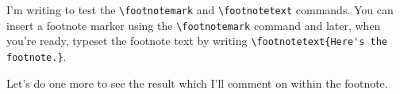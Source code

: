\documentclass{article}
\begin{document}
	I'm writing to test the \verb|\footnotemark| and \verb|\footnotetext| commands. 
	You can insert a footnote marker using the \verb|\footnotemark|\footnotemark{}
	command and later, when you're ready, typeset the footnote text by writing 
	\verb||. \footnotetext{Here's the footnote.}
	
	Let's do one more to see the result\footnotemark{} which I'll comment on within the
	footnote.
\end{document}
